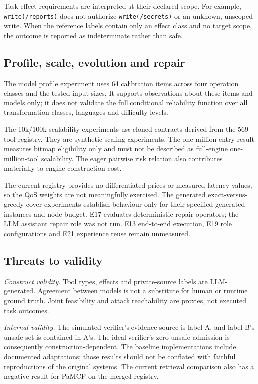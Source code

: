 Task effect requirements are interpreted at their declared scope. For example,
\texttt{write(/reports)} does not authorize \texttt{write(/secrets)} or an unknown, unscoped write. When the
reference labels contain only an effect class and no target scope, the outcome is reported as indeterminate rather
than safe.

\subsection{Profile, scale, evolution and repair}

The model profile experiment uses 64 calibration items across four operation classes and the tested input sizes.
It supports observations about these items and models only; it does not validate the full conditional reliability
function over all transformation classes, languages and difficulty levels.

The 10k/100k scalability experiments use cloned contracts derived from the 569-tool registry. They are synthetic
scaling experiments. The one-million-entry result measures bitmap eligibility only and must not be described as
full-engine one-million-tool scalability. The eager pairwise risk relation also contributes materially to engine
construction cost.

The current registry provides no differentiated prices or measured latency values, so the QoS weights are not
meaningfully exercised. The generated exact-versus-greedy cover experiments establish behaviour only for their
specified generated instances and node budget. E17 evaluates deterministic repair operators; the LLM assistant
repair role was not run. E13 end-to-end execution, E19 role configurations and E21 experience reuse remain
unmeasured.

\subsection{Threats to validity}

\emph{Construct validity.} Tool types, effects and private-source labels are LLM-generated. Agreement between
models is not a substitute for human or runtime ground truth. Joint feasibility and attack reachability are proxies,
not executed task outcomes.

\emph{Internal validity.} The simulated verifier's evidence source is label A, and label B's unsafe set is contained
in A's. The ideal verifier's zero unsafe admission is consequently construction-dependent. The baseline
implementations include documented adaptations; those results should not be conflated with faithful reproductions
of the original systems. The current retrieval comparison also has a negative result for PaMCP on the merged
registry.

